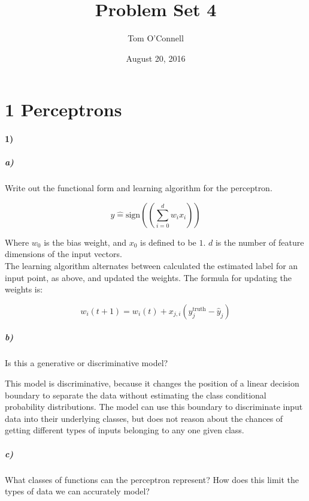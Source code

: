\documentclass[10pt,letter]{article}
\begin{document}

\title{Problem Set 4}

\author{Tom O'Connell}

\date{August 20, 2016}
 
\maketitle 


\section*{1 Perceptrons}

\paragraph{1)}

\subparagraph{a)} Write out the functional form and learning algorithm for the perceptron.

\[ y\hat = \text{sign}((\sum_{i=0}^{d}{w_ix_i}))  \]

Where $w_0$ is the bias weight, and $x_0$ is defined to be $1$. $d$ is the number of feature 
dimensions of the input vectors.\\

The learning algorithm alternates between calculated the estimated label for an input point, as 
above, and updated the weights.  The formula for updating the weights is:

\[ w_i(t + 1) = w_i(t) + x_{j,i} (y_j^\text{truth} - \hat{y}_j)  \]

\subparagraph{b)} Is this a generative or discriminative model?

This model is discriminative, because it changes the position of a linear decision boundary to 
separate the data without estimating the class conditional probability distributions. The model 
can use this boundary to discriminate input data into their underlying classes, but does not reason
 about the chances of getting different types of inputs belonging to any one given class.

\subparagraph{c)} What classes of functions can the perceptron represent? How does this limit the types of data we can accurately model? \\
\end{document}
